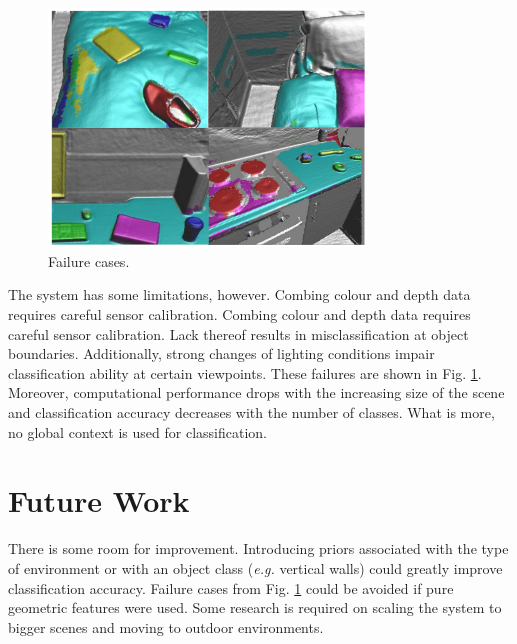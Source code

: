 \documentclass{llncs}
\begin{document}
\begin{figure}[!ht]	 
 \center
 \includegraphics[width=0.75\textwidth]{figures/failures}
 \caption{Failure cases.}
 \label{fig:failures}
\end{figure}
  
  The system has some limitations, however. Combing colour and depth data requires careful sensor calibration. Combing colour and depth data requires careful sensor calibration. Lack thereof results in misclassification at object boundaries. Additionally, strong changes of lighting conditions impair classification ability at certain viewpoints. These failures are shown in Fig. \ref{fig:failures}. Moreover, computational performance drops with the increasing size of the scene and classification accuracy decreases with the number of classes. What is more, no global context is used for classification. 

\section{Future Work}
  
  There is some room for improvement. Introducing priors associated with the type of environment or with an object class (\emph{e.g.} vertical walls) could greatly improve classification accuracy. Failure cases from Fig. \ref{fig:failures} could be avoided if pure geometric features were used. Some research is required on scaling the system to bigger scenes and moving to outdoor environments. 
\end{document}
